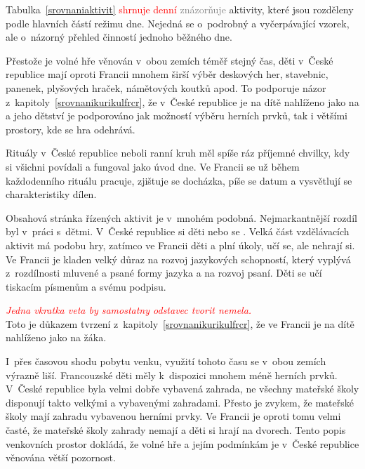 	Tabulka~\ref{srovnaniaktivit} \textcolor{red}{shrnuje denní} \textcolor{gray}{znázorňuje} aktivity, které jsou rozděleny podle hlavních částí režimu dne. Nejedná se o~podrobný a vyčerpávající vzorek, ale o~názorný přehled činností jednoho běžného dne. 

	Přestože je volné hře věnován v~obou zemích téměř stejný čas, děti v~České republice mají oproti Francii mnohem širší výběr deskových her, stavebnic, panenek, plyšových hraček, námětových koutků apod. To podporuje názor z~kapitoly~\ref{srovnanikurikulfrcr}, že v~České republice je na dítě nahlíženo jako na  a jeho dětství je podporováno jak možností výběru herních prvků, tak i většími prostory, kde se hra odehrává. 

	Rituály v~České republice neboli ranní kruh měl spíše ráz příjemné chvilky, kdy si všichni povídali a fungoval jako úvod dne. Ve Francii se už během každodenního rituálu pracuje, zjištuje se docházka, píše se datum a vysvětlují se charakteristiky dílen.

	Obsahová stránka řízených aktivit je v~mnohém podobná. Nejmarkantnější rozdíl byl v~práci s~dětmi. V~České republice si děti  nebo se . Velká část vzdělávacích aktivit má podobu hry, zatímco ve Francii děti  a plní úkoly, učí se, ale nehrají si. Ve Francii je kladen velký důraz na rozvoj jazykových schopností, který vyplývá z~rozdílnosti mluvené a psané formy jazyka a na rozvoj psaní. Děti se učí tiskacím písmenům a svému podpisu.

	\textcolor{red}{\emph{Jedna vkratka veta by samostatny odstavec tvorit nemela.}\\}
	Toto je důkazem tvrzení z~kapitoly~\ref{srovnanikurikulfrcr}, že ve Francii je na dítě nahlíženo jako na žáka.

	I~přes časovou shodu pobytu venku, využití tohoto času se v~obou zemích výrazně liší. Francouzské děti měly k~dispozici mnohem méně herních prvků. V~České republice byla velmi dobře vybavená zahrada, ne všechny mateřské školy disponují takto velkými a vybavenými zahradami. Přesto je zvykem, že mateřské školy mají zahradu vybavenou herními prvky. Ve Francii je oproti tomu velmi časté, že mateřské školy zahrady nemají a děti si hrají na dvorech. Tento popis venkovních prostor dokládá, že volné hře a jejím podmínkám je v~České republice věnována větší pozornost.



		
	


